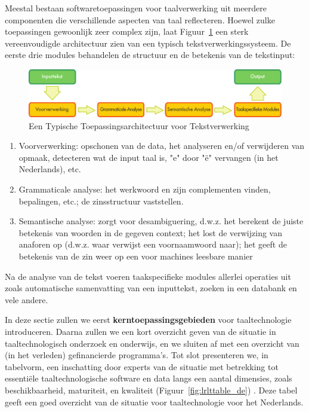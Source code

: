 \begin{multicols}{2}
Meestal bestaan softwaretoepassingen voor taalverwerking uit meerdere componenten die verschillende aspecten van taal reflecteren. Hoewel zulke toepassingen gewoonlijk zeer complex zijn, laat Figuur~\ref{fig:textprocessingarch_de}  een sterk vereenvoudigde architectuur zien van een typisch tekstverwerkingssysteem. De eerste drie modules behandelen de structuur en de betekenis van de tekstinput:
\begin{figure}[b]
  \center
  \includegraphics[width=\textwidth]{../_media/dutch/text_processing_app_architecture}
  \caption{Een Typische Toepassingsarchitectuur voor Tekstverwerking}
  \label{fig:textprocessingarch_de}
\end{figure}
%
    \begin{enumerate}
 	\item Voorverwerking: opschonen van de data, het analyseren en/of verwijderen van opmaak, detecteren wat de input taal is, "e" door "{\"e}" vervangen (in het Nederlands), etc.
 	\item Grammaticale analyse: het werkwoord en zijn complementen vinden, bepalingen, etc.; de zinsstructuur vaststellen.
 	\item Semantische analyse: zorgt voor desambiguering, d.w.z. het berekent de juiste betekenis van woorden in de gegeven context; het lost de verwijzing van anaforen op (d.w.z. waar verwijst een voornaamwoord naar); het geeft de betekenis van de zin weer op een voor machines leesbare manier
    \end{enumerate}
%
    Na de analyse van de tekst voeren taakspecifieke modules  allerlei operaties uit zoals automatische samenvatting van een inputtekst, zoeken in een databank en vele andere.

    In deze sectie  zullen we eerst \textbf{kerntoepassingsgebieden} voor taaltechnologie introduceren. Daarna zullen we een kort overzicht geven van de situatie in taaltechnologisch onderzoek en onderwijs, en we sluiten af met een overzicht van (in het verleden) gefinancierde programma's. Tot slot presenteren we, in tabelvorm, een inschatting door experts van de situatie met betrekking tot essenti{\"e}le taaltechnologische software en data langs een aantal dimensies, zoals beschikbaarheid, maturiteit, en kwaliteit (Figuur~\ref{fig:lrlttable_de}) . Deze tabel geeft een goed overzicht van de situatie voor taaltechnologie voor het Nederlands.


\end{multicols}
